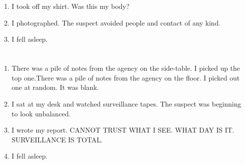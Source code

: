 \documentclass{article}
\begin{document}
    \newpage
    
    \section{}
    
    \begin{enumerate}
    
    \item I took off my shirt. Was this my body?\\
    
    \item I photographed. The suspect avoided people and contact of any kind.\\
    
    \item I fell asleep.\\
    
    \end{enumerate}
     
    \newpage
    
    \section{}
    
    \begin{enumerate}
    
    \item There was a pile of notes from the agency on the side-table. I picked up the top one.There was a pile of notes from the agency on the floor. I picked out one at random. It was blank.\\
    
    \item I sat at my desk and watched surveillance tapes. The suspect was beginning to look unbalanced.\\
    
    \item I wrote my report. CANNOT TRUST WHAT I SEE. WHAT DAY IS IT. SURVEILLANCE IS TOTAL.\\
    
    \item I fell asleep.\\
    
    \end{enumerate}
     
    \newpage
    
    \section{}
    
\end{document}

